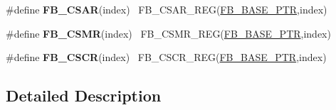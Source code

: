\begin{DoxyCompactItemize}
\item 
\hypertarget{group___f_b___register___accessor___macros_gad14bade8cd71144a1ab53db91b835881}{}\#define {\bfseries F\+B\+\_\+\+C\+S\+A\+R}(index)                                                  ~F\+B\+\_\+\+C\+S\+A\+R\+\_\+\+R\+E\+G(\hyperlink{group___f_b___peripheral_gace69013248279ed94480b3d6f6aa9fa6}{F\+B\+\_\+\+B\+A\+S\+E\+\_\+\+P\+T\+R},index)\label{group___f_b___register___accessor___macros_gad14bade8cd71144a1ab53db91b835881}

\item 
\hypertarget{group___f_b___register___accessor___macros_gac0956d3859461d739b757ff31f57ae5c}{}\#define {\bfseries F\+B\+\_\+\+C\+S\+M\+R}(index)                                                  ~F\+B\+\_\+\+C\+S\+M\+R\+\_\+\+R\+E\+G(\hyperlink{group___f_b___peripheral_gace69013248279ed94480b3d6f6aa9fa6}{F\+B\+\_\+\+B\+A\+S\+E\+\_\+\+P\+T\+R},index)\label{group___f_b___register___accessor___macros_gac0956d3859461d739b757ff31f57ae5c}

\item 
\hypertarget{group___f_b___register___accessor___macros_ga60f6318bba071640865153af2fe7fb33}{}\#define {\bfseries F\+B\+\_\+\+C\+S\+C\+R}(index)                                                  ~F\+B\+\_\+\+C\+S\+C\+R\+\_\+\+R\+E\+G(\hyperlink{group___f_b___peripheral_gace69013248279ed94480b3d6f6aa9fa6}{F\+B\+\_\+\+B\+A\+S\+E\+\_\+\+P\+T\+R},index)\label{group___f_b___register___accessor___macros_ga60f6318bba071640865153af2fe7fb33}

\end{DoxyCompactItemize}


\subsection{Detailed Description}
